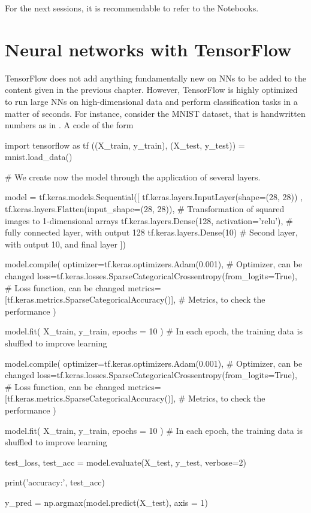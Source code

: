 \documentclass[]{report}
\begin{document}
For the next sessions, it is recommendable to refer to the Notebooks. 

\section{Neural networks with TensorFlow}

TensorFlow does not add anything fundamentally new on NNs to be added to the content given in the previous chapter. However, TensorFlow is highly optimized to run large NNs on high-dimensional data and perform classification tasks in a matter of seconds. For instance, consider the MNIST dataset, that is handwritten numbers as in . A code of the form
\vskip5mm

\begin{boxedverbatim}
import tensorflow as tf
((X_train, y_train), (X_test, y_test)) = mnist.load_data()

# We create now the model through the application of several layers. 

model = tf.keras.models.Sequential([
  tf.keras.layers.InputLayer(shape=(28, 28)) , 
  tf.keras.layers.Flatten(input_shape=(28, 28)), # Transformation of squared images to 1-dimensional arrays
  tf.keras.layers.Dense(128, activation='relu'), # fully connected layer, with output 128
  tf.keras.layers.Dense(10)                      # Second layer, with output 10, and final layer
])

model.compile(
    optimizer=tf.keras.optimizers.Adam(0.001), # Optimizer, can be changed
    loss=tf.keras.losses.SparseCategoricalCrossentropy(from_logits=True), # Loss function, can be changed
    metrics=[tf.keras.metrics.SparseCategoricalAccuracy()], # Metrics, to check the performance
)

model.fit(
    X_train, y_train, epochs = 10
) # In each epoch, the training data is shuffled to improve learning


model.compile(
    optimizer=tf.keras.optimizers.Adam(0.001), # Optimizer, can be changed
    loss=tf.keras.losses.SparseCategoricalCrossentropy(from_logits=True), # Loss function, can be changed
    metrics=[tf.keras.metrics.SparseCategoricalAccuracy()], # Metrics, to check the performance
)

model.fit(
    X_train, y_train, epochs = 10
) # In each epoch, the training data is shuffled to improve learning

test_loss, test_acc = model.evaluate(X_test, y_test, verbose=2)

print('\nTest accuracy:', test_acc)

y_pred = np.argmax(model.predict(X_test), axis = 1)
\end{boxedverbatim}
\vskip5mm
\end{document}
